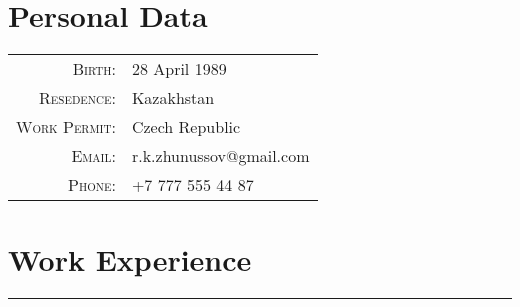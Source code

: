 \documentclass[a4paper,10pt]{article}
\begin{document}
\par{\bigskip\par}
\section*{Personal Data}

\begin{tabular}{rl}
\textsc{Birth:} & 28 April 1989 \\
\textsc{Resedence:} & Kazakhstan \\
\textsc{Work Permit:} & Czech Republic \\
\textsc{Email:} & r.k.zhunussov@gmail.com\\
\textsc{Phone:} & +7 777 555 44 87\\
\end{tabular}

\section*{Work Experience}
\vspace{-0.5ex}%
\rule{\textwidth}{0.3pt}
\vspace{-0.5ex}%
\end{document}
